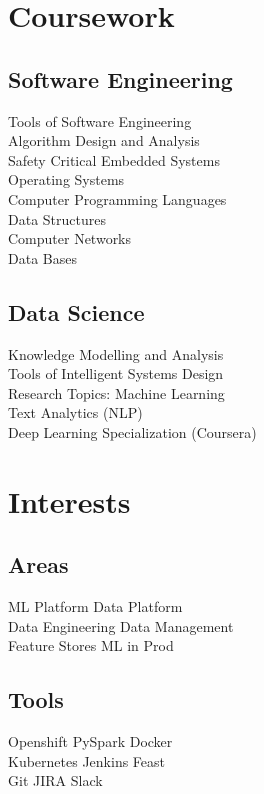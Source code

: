 \documentclass[]{deedy-resume-openfont}
\begin{document}
\begin{minipage}[t]{0.33\textwidth}

\section{Coursework}
\subsection{Software Engineering}
Tools of Software Engineering \\
Algorithm Design and Analysis\\
Safety Critical Embedded Systems \\
Operating Systems \\
Computer Programming Languages \\
Data Structures \\
Computer Networks \\
Data Bases \\
\sectionsep

\subsection{Data Science}
Knowledge Modelling and Analysis \\
Tools of Intelligent Systems Design \\
Research Topics: Machine Learning \\
Text Analytics (NLP) \\
Deep Learning Specialization (Coursera)
\sectionsep


\section{Interests}
\subsection{Areas}
\textbullet{} ML Platform \textbullet{} Data Platform \\
\textbullet{} Data Engineering \textbullet{} Data Management \\
\textbullet{} Feature Stores \textbullet{} ML in Prod

\sectionsep
\subsection{Tools}
\textbullet{} Openshift \textbullet{} PySpark \textbullet{}  Docker \\
\textbullet{} Kubernetes \textbullet{} Jenkins \textbullet{} Feast \\
 \textbullet{} Git \textbullet{} JIRA \textbullet{} Slack 


\end{minipage}
\end{document}
